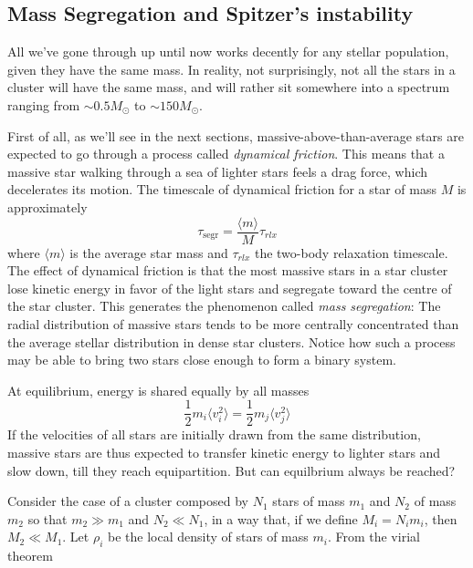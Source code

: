 \subsection{Mass Segregation and Spitzer's instability}
All we've gone through up until now works decently for any stellar population, given they have the same mass. In reality, not surprisingly, not all the stars in a cluster will have the same mass, and will rather sit somewhere into a spectrum ranging from $\sim 0.5M_{\odot}$ to $ \sim 150M_{\odot}$.
\par First of all, as we'll see in the next sections, massive-above-than-average stars are expected to go through a process called \emph{dynamical friction}. This means that a massive star walking through a sea of lighter stars feels a drag force, which decelerates its motion. The timescale of dynamical friction for a star of mass $M$ is approximately
\begin{equation*}
    \tau_{\text{segr}} = \frac{\langle m \rangle}{M}\tau_{rlx}
\end{equation*}
where $\langle m \rangle$ is the average star mass and $\tau_{rlx}$ the two-body relaxation timescale. The eﬀect of dynamical friction is that the most massive stars in a star cluster lose kinetic energy in favor of the light stars and segregate toward the centre of the star cluster. This generates the phenomenon called \emph{mass segregation}: The radial distribution of massive stars tends to be more centrally concentrated than the average stellar distribution in dense star clusters. Notice how such a process may be able to bring two stars close enough to form a binary system.
\par At equilibrium, energy is shared equally by all masses
\begin{equation}
    \frac{1}{2}m_{i}\langle v^{2}_{i} \rangle = \frac{1}{2}m_{j}\langle v^{2}_{j} \rangle
    \label{eq:equipartition_cond}
\end{equation} 
If the velocities of all stars are initially drawn from the same distribution, massive stars are thus expected to transfer kinetic energy to lighter stars and slow down, till they reach equipartition. But can equilbrium always be reached?
\par Consider the case of a cluster composed by $N_{1}$ stars of mass $m_{1}$ and $N_{2}$ of mass $m_{2}$ so that $m_{2}\gg m_{1}$ and $N_{2}\ll N_{1}$, in a way that, if we define $M_{i} = N_{i}m_{i}$, then $M_{2}\ll M_{1}$. Let $\rho_{i}$ be the local density of stars of mass $m_{i}$. From the virial theorem
